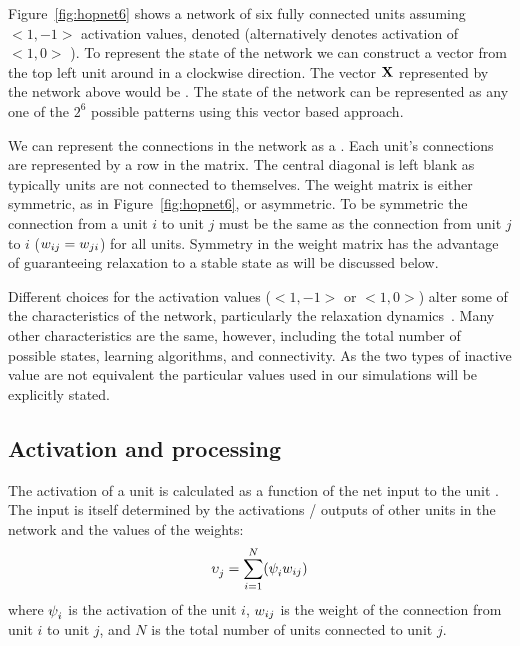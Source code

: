 Figure~\ref{fig:hopnet6} shows a network of six fully connected units assuming $<1, -1>$ activation values, denoted  (alternatively  denotes activation of $<1, 0>$ ).  To represent the state of the network we can construct a vector from the top left unit around in a clockwise direction.  The vector  \(\mathbf{X} \) represented by the network above would be .  The state of the network can be represented as any one of the \(2^6\) possible patterns using this vector based approach.    

We can represent the connections in the network as a  \weightMatrix{}. Each unit's connections are represented by a row in the matrix. The central diagonal is left blank as typically units are not connected to themselves.  The weight matrix is either symmetric, as in Figure~\ref{fig:hopnet6}, or asymmetric.  To be symmetric the connection from a unit $i$ to unit $j$ must be the same as the connection from unit $j$ to $i$ ($w_{ij} = w_{ji}$) for all units.  Symmetry in the weight matrix has the advantage of guaranteeing relaxation to a stable state as will be discussed below.
 
Different choices for the activation values ($<1, -1>$ or $<1, 0>$) alter some of the characteristics of the network, particularly the relaxation dynamics~\citep{Horn1998,Davey2000}. Many other characteristics are the same, however, including the total number of possible states, learning algorithms, and connectivity.  As the two types of inactive value are not equivalent the particular values used in our simulations will be explicitly stated.


\subsection{Activation and processing}   %

The activation of a unit is calculated as a function of the net input to the unit .  The input is itself determined by the activations / outputs of other units in the network and the values of the weights:
\begin{equation}
    \label{eq:unitInput}
    \displaystyle\upsilon_{j}^{} =\sum_{i=1}^{N}(\psi_{i}^{}w_{ij})
\end{equation}
where \(\psi_{i}^{}\) is the activation of the unit $i$, \(w_{ij}\) is the weight of the connection from unit \(i\) to unit \(j\), and \(N\) is the total number of units connected to unit $j$. 

